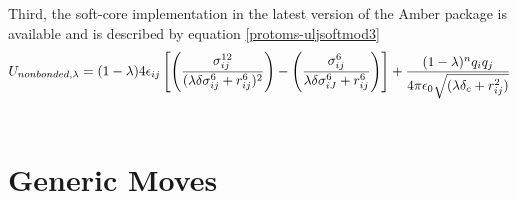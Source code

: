 \documentclass[letterpaper,10pt,english]{manual}
\begin{document}
Third, the soft-core implementation in the latest version of the Amber package is available and is described by equation \eqref{protoms-uljsoftmod3}
\hypertarget{equation-uljsoftmod3}{}\begin{gather}
\begin{split}U_{non bonded,\lambda}= (1-\lambda) 4{\epsilon}_{ij} \left[ \left( \frac{ \sigma_{ij}^{12} }{ ( \lambda \delta \sigma_{ij}^6 + r_{ij}^{6} )^{2}} \right) - \left( \frac{ \sigma_{ij}^{6} }{ \lambda \delta \sigma_{iJ}^6 + r_{ij}^{6} } \right) \right] +  \frac{(1-\lambda)^{n} q_{i}q_{j}} {4\pi{\epsilon}_{0} \sqrt{( \lambda \delta_c +  r_{ij}^{2})}}\end{split}\label{protoms-uljsoftmod3}\\\begin{split}\end{split}\notag
\end{gather}\hypertarget{moves}{}

\section{Generic Moves}
\end{document}
